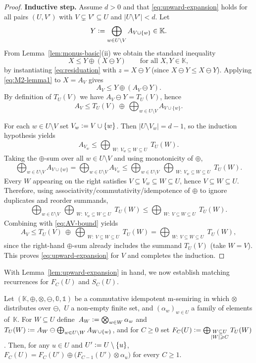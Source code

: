 \begin{toappendix}
\begin{proof}
\smallskip\noindent
\textbf{Inductive step.}
Assume $d>0$ and that \eqref{eq:upward-expansion} holds for all pairs $(U,V')$
with $V\subsetneq V'\subseteq U$ and $|U\setminus V'|<d$.
Let
\[
  Y \mathrel{\mathop:}= \bigoplus_{w\in U\setminus V} A_{V\cup\{w\}} \in \mathbb K.
\]
From Lemma~\ref{lem:monus-basic}(ii) we obtain the standard inequality
\begin{equation}\label{eq:M2-lemma1}
  X \le Y \oplus (X\ominus Y)\qquad\text{for all }X,Y\in \mathbb K,
\end{equation}
by instantiating \eqref{eq:residuation} with $z=X\ominus Y$ (since $X\ominus Y\le X\ominus Y$).
Applying \eqref{eq:M2-lemma1} to $X=A_V$ gives
\[
  A_V \le Y \oplus (A_V\ominus Y).
\]
By definition of $T_U(V)$ we have $A_V\ominus Y = T_U(V)$, hence
\begin{equation}\label{eq:AV-bound}
  A_V \le T_U(V)\ \oplus\ \bigoplus_{w\in U\setminus V} A_{V\cup\{w\}}.
\end{equation}

For each $w\in U\setminus V$ set $V_w\mathrel{\mathop:}= V\cup\{w\}$. Then $|U\setminus V_w|=d-1$,
so the induction hypothesis yields
\[
  A_{V_w}\le \bigoplus_{\substack{W:\;V_w\subseteq W\subseteq U}} T_U(W).
\]
Taking the $\oplus$-sum over all $w\in U\setminus V$ and using monotonicity of $\oplus$,
\[
  \bigoplus_{w\in U\setminus V} A_{V\cup\{w\}}
  =
  \bigoplus_{w\in U\setminus V} A_{V_w}
  \le
  \bigoplus_{w\in U\setminus V}\ \bigoplus_{\substack{W:\;V_w\subseteq W\subseteq U}} T_U(W).
\]
Every $W$ appearing on the right satisfies $V\subseteq V_w\subseteq W\subseteq U$, hence $V\subseteq W\subseteq U$.
Therefore, using associativity/commutativity/idempotence of $\oplus$ to ignore duplicates and reorder summands,
\[
  \bigoplus_{w\in U\setminus V}\ \bigoplus_{\substack{W:\;V_w\subseteq W\subseteq U}} T_U(W)
  \le
  \bigoplus_{\substack{W:\;V\subseteq W\subseteq U}} T_U(W).
\]
Combining with \eqref{eq:AV-bound} yields
\[
  A_V \le T_U(V)\ \oplus\ \bigoplus_{\substack{W:\;V\subseteq W\subseteq U}} T_U(W)
  =
  \bigoplus_{\substack{W:\;V\subseteq W\subseteq U}} T_U(W),
\]
since the right-hand $\oplus$-sum already includes the summand $T_U(V)$ (take $W=V$).
This proves \eqref{eq:upward-expansion} for $V$ and completes the induction.
\end{proof}
With Lemma~\ref{lem:upward-expansion} in hand, we now establish matching
recurrences for $F_C(U)$ and $S_C(U)$.
\begin{lemma}\label{lem:FC_recurrence}
Let $(\mathbb K,\oplus,\otimes,\ominus,\mathbb 0,\mathbb 1)$ be a
commutative idempotent m-semiring in which $\otimes$ distributes over
$\ominus$,~$U$ a non-empty finite set, and $(\alpha_w)_{w\in U}$ a family
of elements of~$\mathbb K$. For $W\subseteq U$ define~$A_W\mathrel{\mathop:}=\bigotimes_{w\in W}\alpha_w$ and
$T_U(W)\mathrel{\mathop:}= A_W\ominus \bigoplus_{w\in U\setminus W}A_{W\cup\{w\}}$, and
for $C\ge 0$ set
$F_C(U)\mathrel{\mathop:}=\bigoplus_{\substack{W\subseteq U\\|W|\geqslant C}} T_U(W)$.
Then, for any $u\in U$ and $U'\mathrel{\mathop:}= U\setminus\{u\}$,
$F_C(U)=F_C(U')\oplus\bigl(F_{C-1}(U')\otimes\alpha_u\bigr)$ for every $C\ge 1$.
\end{lemma}


\end{toappendix}
